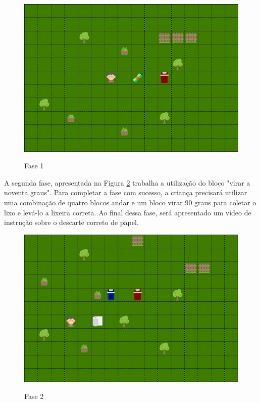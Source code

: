     \begin{figure}[H]
        \caption{Fase 1}
        \centering
        \includegraphics[width=12cm]{Imagens/Cap3/Fases/Fase1.jpg}
        \label{figura:fase_1}
    \end{figure}
    
    A segunda fase, apresentada na Figura \ref{figura:fase_2} trabalha a utilização do bloco "virar a noventa graus". Para completar a fase com sucesso, a criança precisará utilizar uma combinação de quatro blocos andar e um bloco virar 90 graus para coletar o lixo e levá-lo a lixeira correta. Ao final dessa fase, será apresentado um vídeo de instrução sobre o descarte correto de papel.
    
    \begin{figure}[H]
        \caption{Fase 2}
        \centering
        \includegraphics[width=12cm]{Imagens/Cap3/Fases/Fase2.jpg}
        \label{figura:fase_2}
    \end{figure}
    
